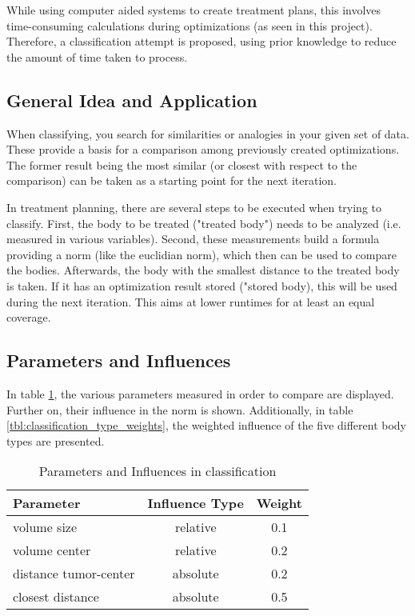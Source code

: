 While using computer aided systems to create treatment plans, this involves time-consuming calculations during optimizations (as seen in this project). Therefore, a classification attempt is proposed, using prior knowledge to reduce the amount of time taken to process.

\subsection{General Idea and Application}
When classifying, you search for similarities or analogies in your given set of data. These provide a basis for a comparison among previously created optimizations. The former result being the most similar (or closest with respect to the comparison) can be taken as a starting point for the next iteration.

In treatment planning, there are several steps to be executed when trying to classify. First, the body to be treated ("treated body") needs to be analyzed (i.e. measured in various variables). Second, these measurements build a formula providing a norm (like the euclidian norm), which then can be used to compare the bodies. Afterwards, the body with the smallest distance to the treated body is taken. If it has an optimization result stored ("stored body), this will be used during the next iteration. This aims at lower runtimes for at least an equal coverage.

\subsection{Parameters and Influences}
In table \ref{tbl:classification_parameters}, the various parameters measured in order to compare are displayed. Further on, their influence in the norm is shown. Additionally, in table \ref{tbl:classification_type_weights}, the weighted influence of the five different body types are presented.
\begin{table}
\centering
\caption{Parameters and Influences in classification}
\begin{tabular}[htbp]{l | c | c}
\textbf{Parameter} & \textbf{Influence Type} & \textbf{Weight} \\ \hline
volume size  & relative & 0.1\\ \hline
volume center & relative & 0.2 \\ \hline
distance tumor-center & absolute & 0.2\\ \hline
closest distance & absolute & 0.5
\end{tabular}
\label{tbl:classification_parameters}
\end{table}

